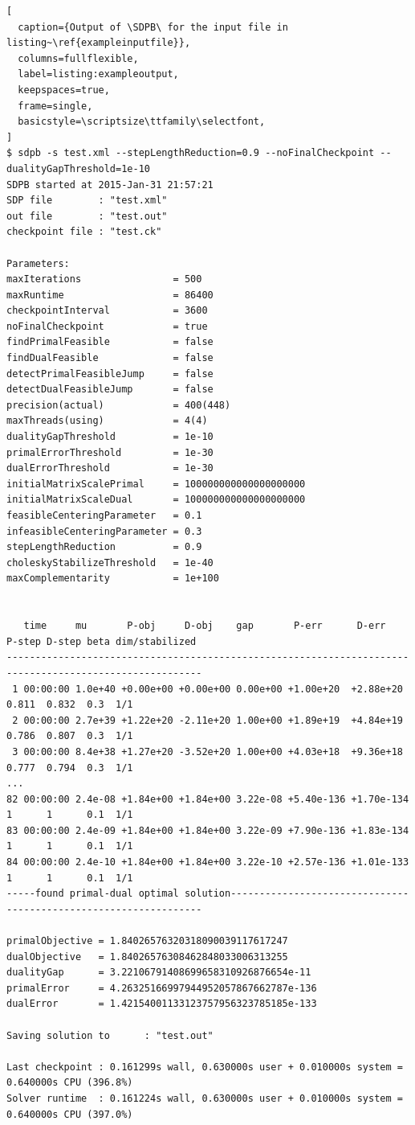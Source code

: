 \documentclass[12pt]{article}
\numberwithin{equation}{section}
\newcommand\SDPB{\texttt{SDPB}}
\begin{document}
\begin{lstlisting}[
  caption={Output of \SDPB\ for the input file in listing~\ref{exampleinputfile}},
  columns=fullflexible,
  label=listing:exampleoutput,
  keepspaces=true,
  frame=single,
  basicstyle=\scriptsize\ttfamily\selectfont,
]
$ sdpb -s test.xml --stepLengthReduction=0.9 --noFinalCheckpoint --dualityGapThreshold=1e-10
SDPB started at 2015-Jan-31 21:57:21
SDP file        : "test.xml"
out file        : "test.out"
checkpoint file : "test.ck"

Parameters:
maxIterations                = 500
maxRuntime                   = 86400
checkpointInterval           = 3600
noFinalCheckpoint            = true
findPrimalFeasible           = false
findDualFeasible             = false
detectPrimalFeasibleJump     = false
detectDualFeasibleJump       = false
precision(actual)            = 400(448)
maxThreads(using)            = 4(4)
dualityGapThreshold          = 1e-10
primalErrorThreshold         = 1e-30
dualErrorThreshold           = 1e-30
initialMatrixScalePrimal     = 100000000000000000000
initialMatrixScaleDual       = 100000000000000000000
feasibleCenteringParameter   = 0.1
infeasibleCenteringParameter = 0.3
stepLengthReduction          = 0.9
choleskyStabilizeThreshold   = 1e-40
maxComplementarity           = 1e+100


   time     mu       P-obj     D-obj    gap       P-err      D-err     P-step D-step beta dim/stabilized
--------------------------------------------------------------------------------------------------------
 1 00:00:00 1.0e+40 +0.00e+00 +0.00e+00 0.00e+00 +1.00e+20  +2.88e+20  0.811  0.832  0.3  1/1
 2 00:00:00 2.7e+39 +1.22e+20 -2.11e+20 1.00e+00 +1.89e+19  +4.84e+19  0.786  0.807  0.3  1/1
 3 00:00:00 8.4e+38 +1.27e+20 -3.52e+20 1.00e+00 +4.03e+18  +9.36e+18  0.777  0.794  0.3  1/1
...
82 00:00:00 2.4e-08 +1.84e+00 +1.84e+00 3.22e-08 +5.40e-136 +1.70e-134 1      1      0.1  1/1
83 00:00:00 2.4e-09 +1.84e+00 +1.84e+00 3.22e-09 +7.90e-136 +1.83e-134 1      1      0.1  1/1
84 00:00:00 2.4e-10 +1.84e+00 +1.84e+00 3.22e-10 +2.57e-136 +1.01e-133 1      1      0.1  1/1
-----found primal-dual optimal solution-----------------------------------------------------------------

primalObjective = 1.84026576320318090039117617247
dualObjective   = 1.84026576308462848033006313255
dualityGap      = 3.22106791408699658310926876654e-11
primalError     = 4.26325166997944952057867662787e-136
dualError       = 1.42154001133123757956323785185e-133

Saving solution to      : "test.out"

Last checkpoint	: 0.161299s wall, 0.630000s user + 0.010000s system = 0.640000s CPU (396.8%)
Solver runtime	: 0.161224s wall, 0.630000s user + 0.010000s system = 0.640000s CPU (397.0%)
\end{lstlisting}
\end{document}
